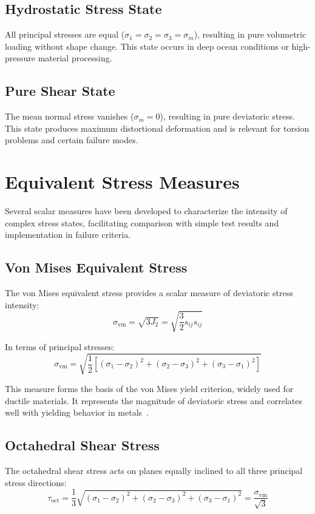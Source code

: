 \subsection{Hydrostatic Stress State}
All principal stresses are equal ($\sigma_1 = \sigma_2 = \sigma_3 = \sigma_m$), resulting in pure volumetric loading without shape change. This state occurs in deep ocean conditions or high-pressure material processing.

\subsection{Pure Shear State}
The mean normal stress vanishes ($\sigma_m = 0$), resulting in pure deviatoric stress. This state produces maximum distortional deformation and is relevant for torsion problems and certain failure modes.

\section{Equivalent Stress Measures}

Several scalar measures have been developed to characterize the intensity of complex stress states, facilitating comparison with simple test results and implementation in failure criteria.

\subsection{Von Mises Equivalent Stress}
The von Mises equivalent stress provides a scalar measure of deviatoric stress intensity:
\begin{equation}
\sigma_{\text{vm}} = \sqrt{3J_2} = \sqrt{\frac{3}{2}s_{ij}s_{ij}}
\end{equation}

In terms of principal stresses:
\begin{equation}
\sigma_{\text{vm}} = \sqrt{\frac{1}{2}[(\sigma_1-\sigma_2)^2 + (\sigma_2-\sigma_3)^2 + (\sigma_3-\sigma_1)^2]}
\end{equation}

This measure forms the basis of the von Mises yield criterion, widely used for ductile materials. It represents the magnitude of deviatoric stress and correlates well with yielding behavior in metals~\autocite{Sadd.2019}.

\subsection{Octahedral Shear Stress}
The octahedral shear stress acts on planes equally inclined to all three principal stress directions:
\begin{equation}
\tau_{\text{oct}} = \frac{1}{3}\sqrt{(\sigma_1-\sigma_2)^2 + (\sigma_2-\sigma_3)^2 + (\sigma_3-\sigma_1)^2} = \frac{\sigma_{\text{vm}}}{\sqrt{3}}
\end{equation}

